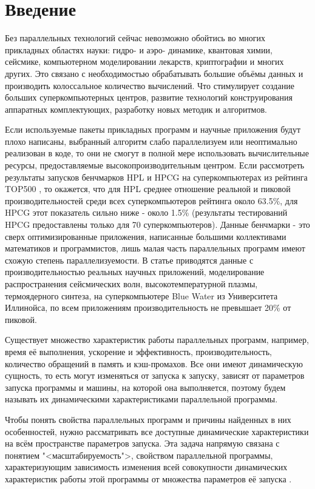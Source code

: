 \section{Введение}
	Без параллельных технологий сейчас невозможно обойтись во многих прикладных областях науки: гидро- и аэро- динамике, квантовая химии, сейсмике, компьютерном моделировании лекарств, криптографии и многих других. Это связано с необходимостью обрабатывать большие объёмы данных и производить колоссальное количество вычислений. Что стимулирует создание больших суперкомпьютерных центров, развитие технологий конструирования аппаратных комплектующих, разработку новых методик и алгоритмов.

	Если используемые пакеты прикладных программ и научные приложения будут плохо написаны, выбранный алгоритм слабо параллелизуем или неоптимально реализован в коде, то они не смогут в полной мере использовать вычислительные ресурсы, предоставляемые высокопроизводительным центром. Если рассмотреть результаты запусков бенчмарков HPL и HPCG на суперкомпьютерах из рейтинга TOP500 \cite{top500}, то окажется, что для HPL среднее отношение реальной и пиковой производительностей среди всех суперкомпьютеров рейтинга около 63.5\%, для HPCG этот показатель сильно ниже - около 1.5\% (результаты тестирований HPCG предоставлены только для 70 суперкомпьютеров). Данные бенчмарки - это сверх оптимизированные приложения, написанные большими коллективами математиков и программистов, лишь малая часть параллельных программ имеют схожую степень параллелизуемости. В статье \cite{Perf_low} приводятся данные с производительностью реальных научных приложений, моделирование распространения сейсмических волн, высокотемпературной плазмы, термоядерного синтеза, на суперкомпьютере Blue Water из Университета Иллинойса, по всем приложениям производительность не превышает 20\% от пиковой.

	Существует множество характеристик работы параллельных программ, например, время её выполнения, ускорение и эффективность, производительность, количество обращений в память и кэш-промахов. Все они имеют динамическую сущность, то есть могут изменяться от запуска к запуску, зависят от параметров запуска программы и машины, на которой она выполняется, поэтому будем называть их динамическими характеристиками параллельной программы.

	Чтобы понять свойства параллельных программ и причины найденных в них особенностей, нужно рассматривать все доступные динамические характеристики на всём пространстве параметров запуска. Эта задача напрямую связана с понятием "<масштабируемость">, свойством параллельной программы, характеризующим зависимость изменения всей совокупности динамических характеристик работы этой программы от множества параметров её запуска \cite{scalability_def}.

